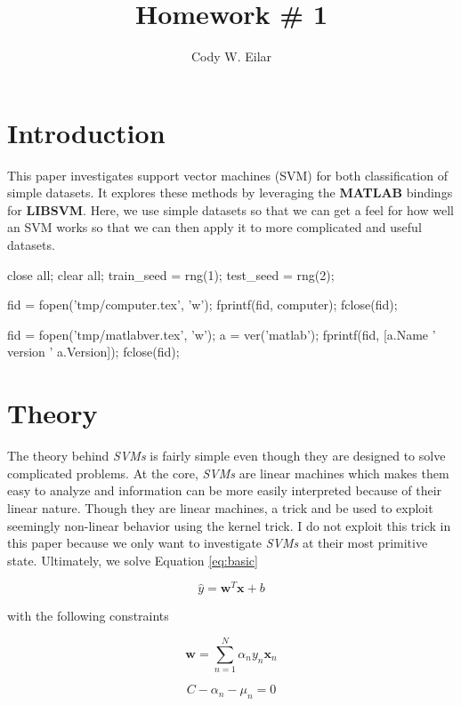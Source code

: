 \documentclass[11pt, twoside]{article}   	%
\title{Homework \# 1}
\author{Cody W. Eilar}
\newenvironment{matlab}{\comment}{\endcomment}
\begin{document}
\maketitle
\section{Introduction} 
This paper investigates support vector machines (SVM) for both classification
 of simple datasets. It explores these methods by leveraging
the \textbf{MATLAB} bindings for \textbf{LIBSVM}. Here, we use simple datasets
so that we can get a feel for how well an SVM works so that we can then 
apply it to more complicated and useful datasets. 

\begin{matlab}
close all; 
clear all;
train_seed = rng(1); 
test_seed = rng(2); 

fid = fopen('tmp/computer.tex', 'w'); 
fprintf(fid, computer); 
fclose(fid); 

fid = fopen('tmp/matlabver.tex', 'w'); 
a = ver('matlab'); 
fprintf(fid, [a.Name ' version ' a.Version]); 
fclose(fid); 
\end{matlab}

\section{Theory}
The theory behind \textit{SVMs} is fairly simple even though they are designed
to solve complicated problems. At the core, \textit{SVMs} are linear machines
which makes them easy to analyze and information can be more easily 
interpreted because of their linear nature. Though they are linear machines,
a trick and be used to exploit seemingly non-linear behavior using the kernel trick. 
I do not exploit this trick in this paper because we only want to investigate
\textit{SVMs} at their most primitive state. Ultimately, we solve Equation \ref{eq:basic} 

\begin{equation}
\hat{y}= \mathbf{w}^T\mathbf{x} + b 
\label{eq:basic}
\end{equation}

with the following constraints

\begin{equation}
\mathbf{w} = \sum\limits_{n=1}^{N} \alpha_n y_n\mathbf{x}_n
\label{eq:c1}
\end{equation}

\begin{equation}
C - \alpha_n -\mu_n = 0
\label{eq:c2}
\end{equation}
\end{document}
